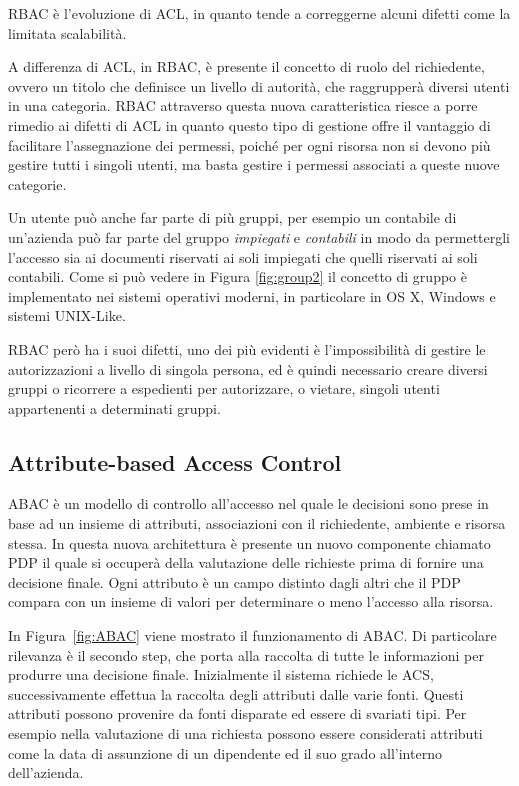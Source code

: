 \ac{RBAC} è l'evoluzione di \ac{ACL}, in quanto tende a correggerne alcuni difetti come la limitata scalabilità. \par
A differenza di \ac{ACL}, in \ac{RBAC}, è presente il concetto di ruolo del richiedente, ovvero un titolo che definisce un livello di autorità, che raggrupperà diversi utenti in una categoria. 
\ac{RBAC} attraverso questa nuova caratteristica riesce a porre rimedio ai difetti di \ac{ACL} in quanto
questo tipo di gestione offre il vantaggio di facilitare l'assegnazione dei permessi, poiché per ogni risorsa non si devono più gestire tutti i singoli utenti, ma basta gestire i permessi associati a queste nuove categorie. 


Un utente può anche far parte di più gruppi, per esempio un contabile di un'azienda può far parte del gruppo \textit{impiegati} e \textit{contabili} in modo da permettergli l'accesso sia ai documenti riservati ai soli impiegati che quelli riservati ai soli contabili.
Come si può vedere in Figura \ref{fig:group2} il concetto di gruppo è implementato nei sistemi operativi moderni, in particolare in OS X, Windows e sistemi UNIX-Like.

\ac{RBAC} però ha i suoi difetti, uno dei più evidenti è l'impossibilità di gestire le autorizzazioni a livello di singola persona, ed è quindi necessario creare diversi gruppi o ricorrere a espedienti per autorizzare, o vietare, singoli utenti appartenenti a determinati gruppi.


\subsection*{Attribute-based Access Control } %
\label{sub:attribute_based_access_control_}

\ac{ABAC} è un modello di controllo all'accesso  nel quale le decisioni sono prese in base ad un insieme 
di attributi, associazioni con il richiedente, ambiente e risorsa stessa.
In questa nuova architettura è presente un nuovo componente chiamato \ac{PDP} il quale si occuperà della valutazione delle richieste prima di fornire una decisione finale.
Ogni attributo è un campo distinto dagli altri che il \ac{PDP} compara con un insieme di valori per determinare o meno l'accesso alla risorsa. 

In Figura~\ref{fig:ABAC} viene mostrato il funzionamento di \ac{ABAC}. Di particolare rilevanza è il secondo step, che porta alla raccolta di tutte le informazioni per produrre una decisione finale.
Inizialmente il sistema richiede le \ac{ACS}, successivamente effettua la raccolta degli attributi dalle varie fonti.
Questi attributi possono provenire da fonti disparate ed essere di svariati tipi. Per esempio nella valutazione di una richiesta possono essere considerati attributi come la data di assunzione di un dipendente ed il suo grado all'interno dell'azienda. 


